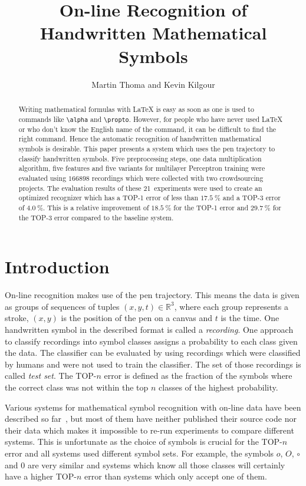 \documentclass[9pt,technote]{IEEEtran}
\title{On-line Recognition of Handwritten Mathematical Symbols}
\author{Martin Thoma and Kevin Kilgour}
\begin{document}
\maketitle
\begin{abstract}
Writing mathematical formulas with \LaTeX{} is easy as soon as one is used to
commands like \verb+\alpha+ and \verb+\propto+. However, for people who have
never used \LaTeX{} or who don't know the English name of the command, it can
be difficult to find the right command. Hence the automatic recognition of
handwritten mathematical symbols is desirable. This paper presents a system
which uses the pen trajectory to classify handwritten symbols. Five
preprocessing steps, one data multiplication algorithm, five features and five
variants for multilayer Perceptron training were evaluated using $\num{166898}$
recordings which were collected with two crowdsourcing projects. The evaluation
results of these 21~experiments were used to create an optimized recognizer
which has a TOP-1 error of less than $\SI{17.5}{\percent}$ and a TOP-3 error of
$\SI{4.0}{\percent}$. This is a relative improvement of $\SI{18.5}{\percent}$ for the
TOP-1 error and $\SI{29.7}{\percent}$ for the TOP-3 error compared to the
baseline system.
\end{abstract}

\section{Introduction}
On-line recognition makes use of the pen trajectory. This means the data is
given as groups of sequences of tuples $(x, y, t) \in \mathbb{R}^3$, where each
group represents a stroke, $(x, y)$ is the position of the pen on a canvas and
$t$ is the time. One handwritten symbol in the described format is called a
\textit{recording}. One approach to classify recordings into symbol classes
assigns a probability to each class given the data. The classifier can be
evaluated by using recordings which were classified by humans and were not used
to train the classifier. The set of those recordings is called \textit{test
set}. The TOP-$n$ error is defined as the fraction of the symbols where
the correct class was not within the top $n$ classes of the highest
probability.

Various systems for mathematical symbol recognition with on-line data have been
described so far~\cite{Kosmala98,Mouchere2013}, but most of them have neither
published their source code nor their data which makes it impossible to re-run
experiments to compare different systems. This is unfortunate as the choice of
symbols is crucial for the TOP-$n$ error and all systems used different symbol
sets. For example, the symbols $o$, $O$, $\circ$ and $0$ are very similar and
systems which know all those classes will certainly have a higher TOP-$n$ error
than systems which only accept one of them.
\end{document}
